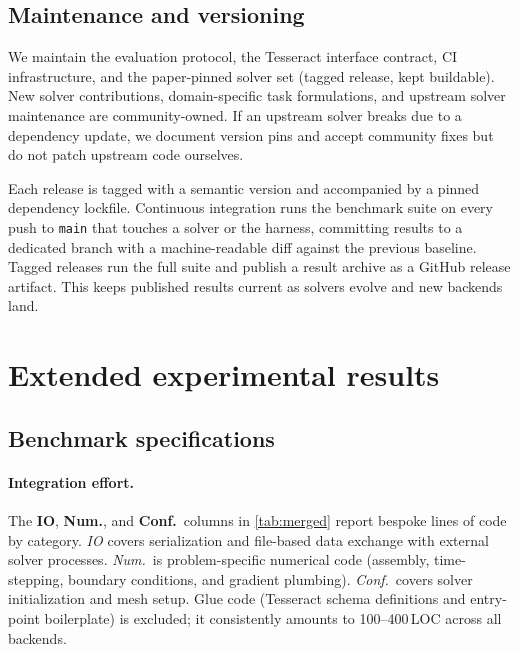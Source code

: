\documentclass{article}
\begin{document}
\subsection{Maintenance and versioning}

We maintain the evaluation protocol, the Tesseract interface contract, CI
infrastructure, and the paper-pinned solver set (tagged release, kept
buildable). New solver contributions, domain-specific task formulations,
and upstream solver maintenance are community-owned. If an upstream solver
breaks due to a dependency update, we document version pins and accept
community fixes but do not patch upstream code ourselves.

Each release is tagged with a semantic version and accompanied by a pinned
dependency lockfile. Continuous integration runs the benchmark suite on
every push to
\texttt{main} that touches a solver or the harness, committing results
to a dedicated branch with a machine-readable diff against the previous
baseline. Tagged releases run the full suite and publish a result archive
as a GitHub release artifact. This keeps published results current as
solvers evolve and new backends land.

\section{Extended experimental results}
\label{app:extended}

\subsection{Benchmark specifications}
\label{app:effort}

\paragraph{Integration effort.}
The \textbf{IO}, \textbf{Num.}, and \textbf{Conf.}\ columns in \cref{tab:merged}
report bespoke lines of code by category.
\emph{IO} covers serialization and file-based data exchange with external solver processes.
\emph{Num.}\ is problem-specific numerical code (assembly, time-stepping, boundary
conditions, and gradient plumbing).
\emph{Conf.}\ covers solver initialization and mesh setup.
Glue code (Tesseract schema definitions and entry-point boilerplate) is excluded; it
consistently amounts to 100--400\,LOC across all backends.
\end{document}
